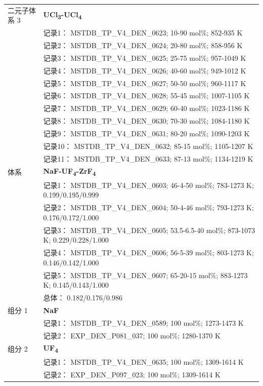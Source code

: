 \documentclass[12pt]{article}
\begin{document}
{\begin{longtable}[]{@{}
  >{\raggedright\arraybackslash}p{}
  >{\raggedright\arraybackslash}p{}@{}}
二元子体系 3  & \textbf{UCl\textsubscript{3}-UCl\textsubscript{4}} \\
 & 记录1： MSTDB\_TP\_V4\_DEN\_0623; 10-90 mol\%; 852-935 K \\
 & 记录2： MSTDB\_TP\_V4\_DEN\_0624; 20-80 mol\%; 858-956 K \\
 & 记录3： MSTDB\_TP\_V4\_DEN\_0625; 25-75 mol\%; 957-1049 K \\
 & 记录4： MSTDB\_TP\_V4\_DEN\_0626; 40-60 mol\%; 949-1012 K \\
 & 记录5： MSTDB\_TP\_V4\_DEN\_0627; 50-50 mol\%; 960-1117 K \\
 & 记录6： MSTDB\_TP\_V4\_DEN\_0628; 55-45 mol\%; 1007-1105 K \\
 & 记录7： MSTDB\_TP\_V4\_DEN\_0629; 60-40 mol\%; 1023-1186 K \\
 & 记录8： MSTDB\_TP\_V4\_DEN\_0630; 70-30 mol\%; 1084-1180 K \\
 & 记录9： MSTDB\_TP\_V4\_DEN\_0631; 80-20 mol\%; 1090-1203 K \\
 & 记录10： MSTDB\_TP\_V4\_DEN\_0632; 85-15 mol\%; 1105-1207 K \\
 & 记录11： MSTDB\_TP\_V4\_DEN\_0633; 87-13 mol\%; 1134-1219 K  \\

\midrule
体系 & \textbf{NaF-UF\textsubscript{4}-ZrF\textsubscript{4}} \\
 & 记录1： MSTDB\_TP\_V4\_DEN\_0603; 46-4-50 mol\%; 783-1273 K; 0.199/0.195/0.999 \\
 & 记录2： MSTDB\_TP\_V4\_DEN\_0604; 50-4-46 mol\%; 793-1273 K; 0.176/0.172/1.000 \\
 & 记录3： MSTDB\_TP\_V4\_DEN\_0605; 53.5-6.5-40 mol\%; 873-1073 K; 0.229/0.228/1.000 \\
 & 记录4： MSTDB\_TP\_V4\_DEN\_0606; 56-5-39 mol\%; 803-1273 K; 0.146/0.142/1.000 \\
 & 记录5： MSTDB\_TP\_V4\_DEN\_0607; 65-20-15 mol\%; 883-1273 K; 0.145/0.143/1.000 \\
 & 总体： 0.182/0.176/0.986  \\

组分 1  & \textbf{NaF} \\
 & 记录1： MSTDB\_TP\_V4\_DEN\_0589; 100 mol\%; 1273-1473 K \\
 & 记录2： EXP\_DEN\_P081\_037; 100 mol\%; 1280-1370 K  \\

组分 2  & \textbf{UF\textsubscript{4}} \\
 & 记录1： MSTDB\_TP\_V4\_DEN\_0635; 100 mol\%; 1309-1614 K \\
 & 记录2： EXP\_DEN\_P097\_023; 100 mol\%; 1309-1614 K  \\


\end{longtable}}
\end{document}
